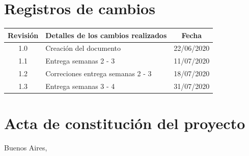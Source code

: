 \documentclass[11pt]{charter}
\begin{document}
\maketitle
\thispagestyle{empty}
\pagebreak


\thispagestyle{empty}
{\setlength{\parskip}{0pt}
\tableofcontents{}
}
\pagebreak


\section{Registros de cambios}
\label{sec:registro}


\begin{table}[ht]
\label{tab:registro}
\centering

\begin{tabularx}{\linewidth}{@{}|c|X|c|@{}}
\hline
\rowcolor[HTML]{C0C0C0} 
\hline
Revisión & \multicolumn{1}{c|}{\cellcolor[HTML]{C0C0C0}Detalles de los cambios realizados} & Fecha      \\ \hline
1.0      & Creación del documento                                                          & 22/06/2020 \\ \hline
1.1      & Entrega semanas 2 - 3                                         & 11/07/2020 \\ 
\hline
1.2      & Correciones entrega semanas 2 - 3 & 18/07/2020  \\
\hline
1.3      & Entrega semanas 3 - 4 & 31/07/2020  \\
\hline
\end{tabularx}
\end{table}

\pagebreak



\section{Acta de constitución del proyecto}
\label{sec:acta}

\begin{flushright}
Buenos Aires, \fechaInicioName
\end{flushright}

\vspace{2cm}
\end{document}
